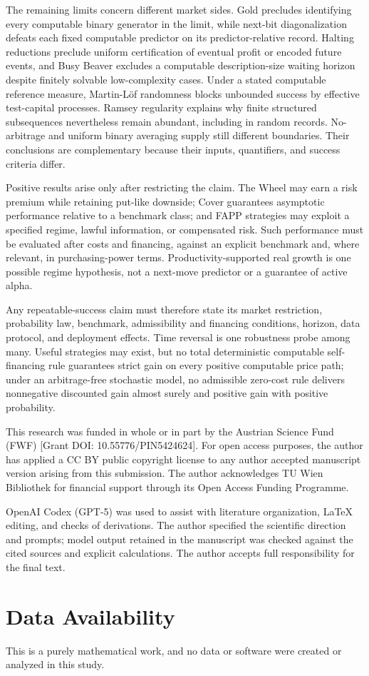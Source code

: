 \documentclass[aps,pra,reprint,superscriptaddress,amsmath,amssymb,floatfix]{revtex4-2}
\theoremstyle{plain}
\theoremstyle{definition}
\theoremstyle{remark}
\begin{document}
The remaining limits concern different market sides. Gold precludes identifying
every computable binary generator in the limit, while next-bit diagonalization
defeats each fixed computable predictor on its predictor-relative record.
Halting reductions preclude uniform certification of eventual profit or encoded
future events, and Busy Beaver excludes a computable description-size waiting
horizon despite finitely solvable low-complexity cases. Under a stated
computable reference measure, Martin-L\"of randomness blocks unbounded success
by effective test-capital processes. Ramsey regularity explains why finite
structured subsequences nevertheless remain abundant, including in random
records. No-arbitrage and uniform binary averaging supply still different
boundaries. Their conclusions are complementary because their inputs,
quantifiers, and success criteria differ.

Positive results arise only after restricting the claim. The Wheel may earn a
risk premium while retaining put-like downside; Cover guarantees asymptotic
performance relative to a benchmark class; and FAPP strategies may exploit a
specified regime, lawful information, or compensated risk. Such performance
must be evaluated after costs and financing, against an explicit benchmark and,
where relevant, in purchasing-power terms. Productivity-supported real growth
is one possible regime hypothesis, not a next-move predictor or a guarantee of
active alpha.

Any repeatable-success claim must therefore state its market restriction,
probability law, benchmark, admissibility and financing conditions, horizon,
data protocol, and deployment effects. Time reversal is one robustness probe
among many. Useful strategies may exist, but no total deterministic computable
self-financing rule guarantees strict gain on every positive computable price
path; under an arbitrage-free stochastic model, no admissible zero-cost rule
delivers nonnegative discounted gain almost surely and positive gain with
positive probability.

\begin{acknowledgments}
This research was funded in whole or in part by the Austrian Science Fund
(FWF) [Grant DOI: 10.55776/PIN5424624]. For open access purposes, the author
has applied a CC BY public copyright license to any author accepted manuscript
version arising from this submission. The author acknowledges TU Wien
Bibliothek for financial support through its Open Access Funding Programme.

OpenAI Codex (GPT-5) was used to assist with literature organization, LaTeX
editing, and checks of derivations. The author specified the scientific
direction and prompts; model output retained in the manuscript was checked
against the cited sources and explicit calculations. The author accepts full
responsibility for the final text.
\end{acknowledgments}

\section*{Data Availability}
This is a purely mathematical work, and no data or software were created or
analyzed in this study.


\end{document}
